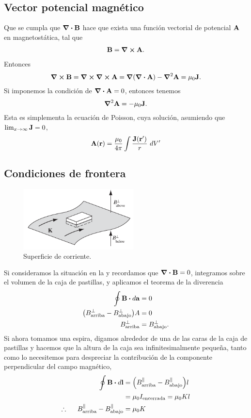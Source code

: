 \subsection{Vector potencial magnético}
Que se cumpla que $\div{\vb{B}}$ hace que exista una función 
vectorial de potencial $\vb{A}$ en magnetostática, tal que 
\begin{align}
\vb{B}=\curl{\vb{A}}.
\end{align}
Entonces
\begin{align}
\curl{\vb{B}}=\curl{\curl{\vb{A}}}=\grad{\qty(\div{\vb{A}})}
-\grad^2\vb{A}=\mu_0\vb{J}.
\end{align}
Si imponemos la condición de $\div{\vb{A}}=0$, entonces tenemos 
\begin{align}
\grad^2\vb{A}=-\mu_0\vb{J}.
\label{•}
\end{align}
Esta es simplementa la ecuación de Poisson, cuya solución, 
asumiendo que $\lim_{x\to\infty}\vb{J}=0$,
\begin{align}
\vb{A}(\vb{r})=\frac{\mu_0}{4\pi}\int \frac{\vb{J}(\vb{r}')}{r}\ dV'
\label{}
\end{align}
\subsection{Condiciones de frontera}
\begin{figure}
  \centering
  \includegraphics[width=6cm]{images/sup-current.png}
  \caption{Superficie de corriente.}
  \label{fig:sup-current}
\end{figure}
Si consideramos la situación en la  y recordamos que
$\div{\vb{B}}=0$, integramos sobre el volumen de la caja de pastillas,
y aplicamos el teorema de la diverencia 
\begin{align}
\oint \vb{B}\vdot d\vb{a}&=0\\
\qty(B^{\perp}_{\tx{arriba}}-B^{\perp}_{\tx{abajo}})A&=0\\
B^{\perp}_{\tx{arriba}}&=B^{\perp}_{\tx{abajo}}.
\end{align}
Si ahora tomamos una espira, digamos alrededor de una de las caras
de la caja de pastillas y hacemos que la altura de la caja sea 
infinitesimalmente pequeña, tanto como lo necesitemos para 
despreciar la contribución de la componente perpendicular 
del campo magnético, 
\begin{align}
\oint \vb{B}\vdot d\vb{l}&=
\qty(B^{\parallel}_{\tx{arriba}}-B^{\parallel}_{\tx{abajo}})l\\
&=\mu_0I_{\tx{encerrada}}=\mu_0Kl\\
\therefore \hspace{5mm}
B^{\parallel}_{\tx{arriba}}-B^{\parallel}_{\tx{abajo}}&=\mu_0K
\end{align}

